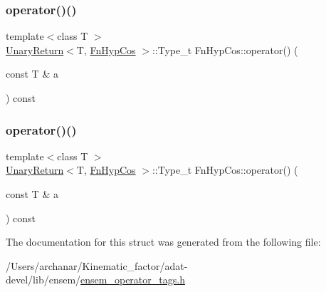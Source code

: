 \mbox{\label{structFnHypCos_ab6e05ff6650f0719ca08b86905fba763}} 
\subsubsection{\texorpdfstring{operator()()}{operator()()}\hspace{0.1cm}{\footnotesize\ttfamily [2/3]}}
{\footnotesize\ttfamily template$<$class T $>$ \\
\mbox{\hyperlink{structUnaryReturn}{Unary\+Return}}$<$T, \mbox{\hyperlink{structFnHypCos}{Fn\+Hyp\+Cos}} $>$\+::Type\+\_\+t Fn\+Hyp\+Cos\+::operator() (\begin{DoxyParamCaption}\item[{const T \&}]{a }\end{DoxyParamCaption}) const\hspace{0.3cm}{\ttfamily [inline]}}

\mbox{\label{structFnHypCos_ab6e05ff6650f0719ca08b86905fba763}} 
\subsubsection{\texorpdfstring{operator()()}{operator()()}\hspace{0.1cm}{\footnotesize\ttfamily [3/3]}}
{\footnotesize\ttfamily template$<$class T $>$ \\
\mbox{\hyperlink{structUnaryReturn}{Unary\+Return}}$<$T, \mbox{\hyperlink{structFnHypCos}{Fn\+Hyp\+Cos}} $>$\+::Type\+\_\+t Fn\+Hyp\+Cos\+::operator() (\begin{DoxyParamCaption}\item[{const T \&}]{a }\end{DoxyParamCaption}) const\hspace{0.3cm}{\ttfamily [inline]}}



The documentation for this struct was generated from the following file\+:\begin{DoxyCompactItemize}
\item 
/\+Users/archanar/\+Kinematic\+\_\+factor/adat-\/devel/lib/ensem/\mbox{\hyperlink{adat-devel_2lib_2ensem_2ensem__operator__tags_8h}{ensem\+\_\+operator\+\_\+tags.\+h}}\end{DoxyCompactItemize}
